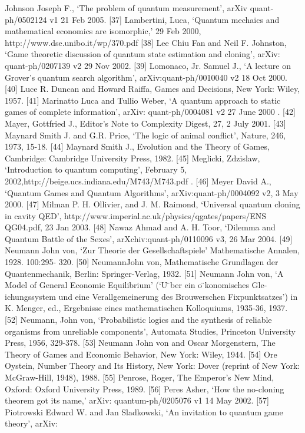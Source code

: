 \begin{verbatim*}
[36] Johnson Joseph F., ‘The problem of quantum measurement’, arXiv quant-ph/0502124 v1 21 Feb 2005.
[37] Lambertini, Luca, ‘Quantum mechaics and mathematical economics are isomorphic,’ 29 Feb 2000,
http://www.dse.unibo.it/wp/370.pdf
[38] Lee Chiu Fan and Neil F. Johnston, ‘Game theoretic discussion of quantum state estimation and
cloning’, arXiv: quant-ph/0207139 v2 29 Nov 2002.
[39] Lomonaco, Jr. Samuel J., ‘A lecture on Grover’s quantum search algorithm’, arXiv:quant-ph/0010040
v2 18 Oct 2000.
[40] Luce R. Duncan and Howard Raiffa, Games and Decisions, New York: Wiley, 1957.
[41] Marinatto Luca and Tullio Weber, ‘A quantum approach to static games of complete information’,
arXiv: quant-ph/0004081 v2 27 June 2000 .
[42] Mayer, Gottfried J., Editor’s Note to Complexity Digest, 27, 2 July 2001.
[43] Maynard Smith J. and G.R. Price, ‘The logic of animal conflict’, Nature, 246, 1973, 15-18.
[44] Maynard Smith J., Evolution and the Theory of Games, Cambridge: Cambridge University Press,
1982.
[45] Meglicki, Zdzislaw, ‘Introduction to quantum computing’, February 5, 2002,http://beige.ucs.indiana.edu/M743/M743.pdf .
[46] Meyer David A., ‘Quantum Games and Quantum Algorithms’, arXiv:quant-ph/0004092 v2, 3 May
2000.
[47] Milman P. H. Ollivier, and J. M. Raimond, ‘Universal quantum cloning in cavity QED’,
http://www.imperial.ac.uk/physics/qgates/papers/ENS QG04.pdf, 23 Jan 2003.
[48] Nawaz Ahmad and A. H. Toor, ‘Dilemma and Quantum Battle of the Sexes’,
arXchiv:quant-ph/0110096 v3, 26 Mar 2004.
[49] Neumann John von, ‘Zur Theorie der Gesellschaftspiele’ Mathematische Annalen, 1928. 100:295-
320.
[50] NeumannJohn von, Mathematische Grundlagen der Quantenmechanik, Berlin: Springer-Verlag,
1932.
[51] Neumann John von, ‘A Model of General Economic Equilibrium’ (‘U ̈ber ein o ̈konomisches Gle-
ichungssystem und eine Verallgemeinerung des Brouwerschen Fixpunktsatzes’) in K. Menger, ed.,
Ergebnisse eines mathematischen Kolloquiums, 1935-36, 1937.
[52] Neumann, John von, ‘Probabilistic logics and the synthesis of reliable organisms from unreliable
components’, Automata Studies, Princeton University Press, 1956, 329-378.
[53] Neumann John von and Oscar Morgenstern, The Theory of Games and Economic Behavior, New
York: Wiley, 1944.
[54] Ore Oystein, Number Theory and Its History, New York: Dover (reprint of New York: McGraw-Hill,
1948), 1988.
[55] Penrose, Roger, The Emperor’s New Mind, Oxford: Oxford University Press, 1989.
[56] Peres Asher, ‘How the no-cloning theorem got its name,’ arXiv: quantum-ph/0205076 v1 14 May
2002.
[57] Piotrowski Edward W. and Jan Sladkowski, ‘An invitation to quantum game theory’, arXiv:

\end{verbatim*}
